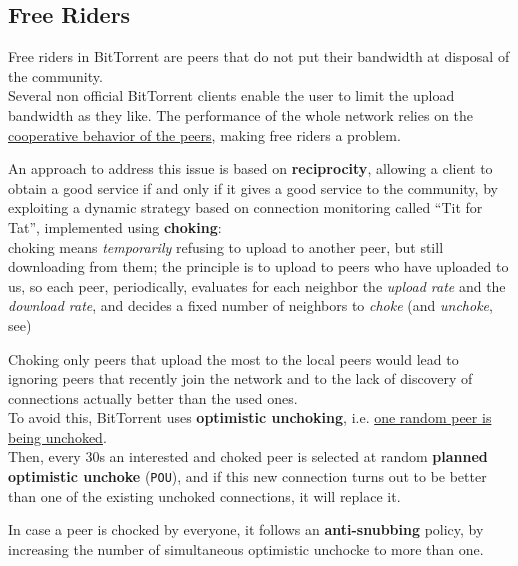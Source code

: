 \subsection{Free Riders}
Free riders in BitTorrent are peers that do not put their bandwidth at disposal of the community.\\
Several non official BitTorrent clients enable the user to limit the upload bandwidth as they like.
The performance of the whole network relies on the \ul{cooperative behavior of the peers}, making free riders a problem.

An approach to address this issue is based on \textbf{reciprocity}, allowing a client to obtain a good service if and only if it gives a good service to the community, by exploiting a dynamic strategy based on connection monitoring called ``Tit for Tat'', implemented using \textbf{choking}:\\
choking means \textit{temporarily} refusing to upload to another peer, but still downloading from them;  
the principle is to upload to peers who have uploaded to us, so each peer, periodically, evaluates for each neighbor  the \textit{upload rate} and the \textit{download rate}, and decides a fixed number of neighbors to \textit{choke} (and \textit{unchoke}, see)


Choking only peers that upload the most to the local peers would lead to ignoring peers that recently join the network
and to the lack of discovery of connections actually better than the used ones.\\
To avoid this, BitTorrent uses \textbf{optimistic unchoking}, i.e. \ul{one random peer is being unchoked}.\\
Then, every 30s an interested and choked peer is selected at random \textbf{planned optimistic unchoke} (\texttt{POU}), and if this new connection turns out to be better than one of the existing
unchoked connections, it will replace it.

In case a peer is chocked by everyone, it follows an \textbf{anti-snubbing} policy, by increasing the number of simultaneous optimistic
unchocke to more than one.

